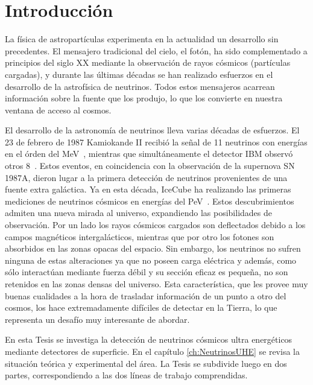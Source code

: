 \chapter{Introducci\'on}
\label{ch:intro}

La f\'isica de astropart\'iculas experimenta en la actualidad un desarrollo sin precedentes. 
El mensajero tradicional del cielo, el fot\'on, ha sido complementado a principios del siglo XX mediante la observaci\'on de rayos c\'osmicos (part\'iculas cargadas), y durante las \'ultimas d\'ecadas se han realizado esfuerzos en el desarrollo de la astrof\'isica de neutrinos.
Todos estos mensajeros acarrean informaci\'on sobre la fuente que los produjo, lo que los convierte en nuestra ventana de acceso al cosmos.

El desarrollo de la astronom\'ia de neutrinos lleva varias d\'ecadas de esfuerzos. 
El 23 de febrero de 1987 Kamiokande II recibi\'o la se\~nal de 11 neutrinos con energ\'ias en el \'orden del MeV~\cite{cite:kamiokande}, mientras que simult\'aneamente el detector IBM observ\'o otros 8~\cite{cite:IBMnu}.
Estos eventos, en coincidencia con la observaci\'on de la supernova SN 1987A, dieron lugar a la primera detecci\'on de neutrinos provenientes de una fuente extra gal\'actica.
Ya en esta d\'ecada, IceCube ha realizando las primeras mediciones de neutrinos c\'osmicos en energ\'ias del PeV~\cite{cite:IceCube1}.
Estos descubrimientos admiten una nueva mirada al universo, expandiendo las posibilidades de observaci\'on.
Por un lado los rayos c\'osmicos cargados son deflectados debido a los campos magn\'eticos intergal\'acticos, mientras que por otro los fotones son absorbidos en las zonas opacas del espacio. 
Sin embargo, los neutrinos no sufren ninguna de estas alteraciones ya que no poseen carga el\'ectrica y adem\'as, como s\'olo interact\'uan mediante fuerza d\'ebil y su secci\'on eficaz es peque\~na, no son retenidos en las zonas densas del universo.
Esta caracter\'istica, que les provee muy buenas cualidades a la hora de trasladar informaci\'on de un punto a otro del cosmos, los hace extremadamente dif\'iciles de detectar en la Tierra, lo que representa un desaf\'io muy interesante de abordar.

En esta Tesis se investiga la detecci\'on de neutrinos c\'osmicos ultra energ\'eticos mediante detectores de superficie.  En el cap\'itulo \ref{ch:NeutrinosUHE} se revisa la situaci\'on te\'orica y experimental del \'area. La Tesis se subdivide luego en dos partes, correspondiendo a las dos líneas de trabajo comprendidas.

